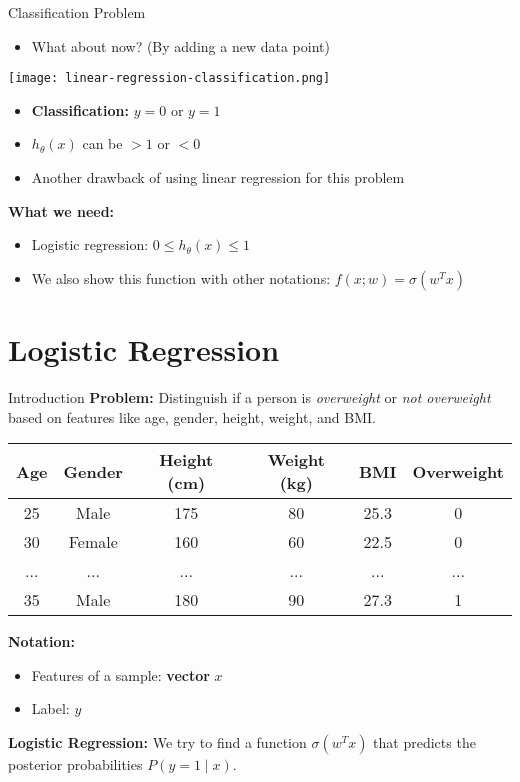 \documentclass[serif, aspectratio=169]{beamer}
\begin{document}
\begin{frame}{Classification Problem}
    \begin{itemize}
        \item What about now? (By adding a new data point)
    \end{itemize}

    \centering
    \texttt{[image: linear-regression-classification.png]}
    

\begin{itemize}
    \item \textbf{Classification:} $y = 0$ or $y = 1$
    \item $h_\theta(x)$ can be $> 1$ or $< 0$
    \item Another drawback of using linear regression for this problem
\end{itemize}

\vspace{0.5cm}
\textbf{What we need:}
\begin{itemize}
    \item Logistic regression: $0 \leq h_\theta(x) \leq 1$
    \item We also show this function with other notations: $f(x; w) = \sigma(w^T x)$
\end{itemize}
\end{frame}

\section{Logistic Regression}

\begin{frame}{Introduction}
\textbf{Problem:} Distinguish if a person is \textit{overweight} or \textit{not overweight} based on features like age, gender, height, weight, and BMI.

\begin{table}[h]
\centering
\begin{tabular}{|c|c|c|c|c|c|}
\hline
Age & Gender & Height (cm) & Weight (kg) & BMI & Overweight \\
\hline
25 & Male & 175 & 80 & 25.3 & 0 \\
30 & Female & 160 & 60 & 22.5 & 0 \\
... & ... & ... & ... & ... & ... \\
35 & Male & 180 & 90 & 27.3 & 1 \\
\hline
\end{tabular}
\end{table}

\vspace{0.5cm}
\textbf{Notation:}
\begin{itemize}
    \item Features of a sample: \textbf{vector} $x$
    \item Label: $y$
\end{itemize}

\vspace{0.5cm}
\textbf{Logistic Regression:} We try to find a function $\sigma(w^T x)$ that predicts the posterior probabilities $P(y = 1 \mid x)$.
\end{frame}
\end{document}
